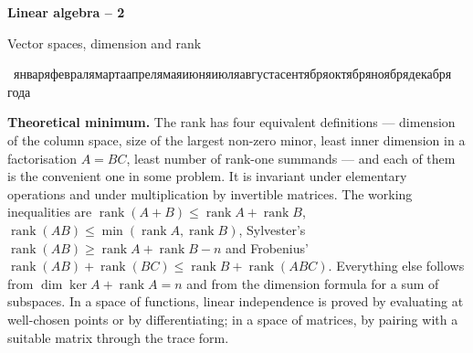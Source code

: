 \documentclass[11pt,a4paper]{article}
\newcommand{\head}[1]{\par\medskip\noindent\textbf{#1}\quad}
\newcommand{\rudate}{\number\day~\ifcase\month\or января\or февраля\or марта\or апреля\or мая\or июня\or июля\or августа\or сентября\or октября\or ноября\or декабря\fi~\number\year~года}
\newcommand{\sheettitle}[3]{%
  \begin{center}
  {\huge\bfseries #1\par}\vspace{1.2em}
  {\Large #2\par}\vspace{0.8em}
  \if\relax\detokenize{#3}\relax\else{\Large #3\par}\vspace{0.8em}\fi
  {\foreignlanguage{russian}{\rudate}\par}
  \end{center}\vspace{0.5em}}
\DeclareMathOperator{\rank}{rank}
\begin{document}
\sheettitle{Linear algebra -- 2}{Vector spaces, dimension and rank}{Homework}

\head{Theoretical minimum.} The rank has four equivalent definitions --- dimension of the column
space, size of the largest non-zero minor, least inner dimension in a factorisation $A=BC$, least
number of rank-one summands --- and each of them is the convenient one in some problem. It is
invariant under elementary operations and under multiplication by invertible matrices. The working
inequalities are $\rank(A+B)\le\rank A+\rank B$, $\rank(AB)\le\min(\rank A,\rank B)$, Sylvester's
$\rank(AB)\ge\rank A+\rank B-n$ and Frobenius' $\rank(AB)+\rank(BC)\le\rank B+\rank(ABC)$.
Everything else follows from $\dim\ker A+\rank A=n$ and from the dimension formula for a sum of
subspaces. In a space of functions, linear independence is proved by evaluating at well-chosen
points or by differentiating; in a space of matrices, by pairing with a suitable matrix through the
trace form.

\bigskip
\end{document}
